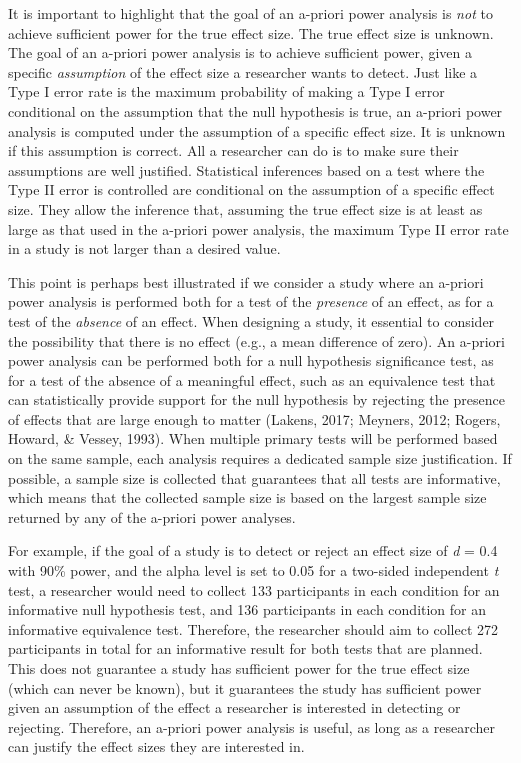 \documentclass[
  english,
  ,jou,floatsintext]{apa6}
\begin{document}
It is important to highlight that the goal of an a-priori power analysis is \emph{not} to achieve sufficient power for the true effect size. The true effect size is unknown. The goal of an a-priori power analysis is to achieve sufficient power, given a specific \emph{assumption} of the effect size a researcher wants to detect. Just like a Type I error rate is the maximum probability of making a Type I error conditional on the assumption that the null hypothesis is true, an a-priori power analysis is computed under the assumption of a specific effect size. It is unknown if this assumption is correct. All a researcher can do is to make sure their assumptions are well justified. Statistical inferences based on a test where the Type II error is controlled are conditional on the assumption of a specific effect size. They allow the inference that, assuming the true effect size is at least as large as that used in the a-priori power analysis, the maximum Type II error rate in a study is not larger than a desired value.

This point is perhaps best illustrated if we consider a study where an a-priori power analysis is performed both for a test of the \emph{presence} of an effect, as for a test of the \emph{absence} of an effect. When designing a study, it essential to consider the possibility that there is no effect (e.g., a mean difference of zero). An a-priori power analysis can be performed both for a null hypothesis significance test, as for a test of the absence of a meaningful effect, such as an equivalence test that can statistically provide support for the null hypothesis by rejecting the presence of effects that are large enough to matter (Lakens, 2017; Meyners, 2012; Rogers, Howard, \& Vessey, 1993). When multiple primary tests will be performed based on the same sample, each analysis requires a dedicated sample size justification. If possible, a sample size is collected that guarantees that all tests are informative, which means that the collected sample size is based on the largest sample size returned by any of the a-priori power analyses.

For example, if the goal of a study is to detect or reject an effect size of \emph{d} = 0.4 with 90\% power, and the alpha level is set to 0.05 for a two-sided independent \emph{t} test, a researcher would need to collect 133 participants in each condition for an informative null hypothesis test, and 136 participants in each condition for an informative equivalence test. Therefore, the researcher should aim to collect 272 participants in total for an informative result for both tests that are planned. This does not guarantee a study has sufficient power for the true effect size (which can never be known), but it guarantees the study has sufficient power given an assumption of the effect a researcher is interested in detecting or rejecting. Therefore, an a-priori power analysis is useful, as long as a researcher can justify the effect sizes they are interested in.
\end{document}
